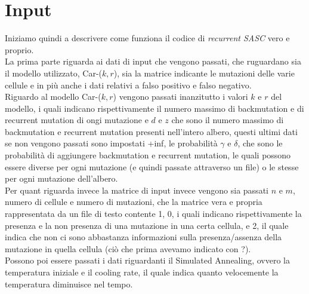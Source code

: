 \documentclass{report}
\begin{document}
  \section{Input}
  Iniziamo quindi a descrivere come funziona il codice di \emph{recurrent SASC} vero e proprio.\\
  La prima parte riguarda ai dati di input che vengono passati, che ruguardano sia il modello utilizzato, Car-($k, r$), sia la matrice indicante le mutazioni delle varie cellule e in più anche i dati relativi a falso positivo e falso negativo.\\
  Riguardo al modello Car-($k, r$) vengono passati inanzitutto i valori $k$ e $r$ del modello, i quali indicano rispettivamente il numero massimo di backmutation e di recurrent mutation di ongi mutazione e $d$ e $z$ che sono il numero massimo di backmutation e recurrent mutation presenti nell'intero albero, questi ultimi dati se non vengono passati sono impostati +inf, le probabilità $\gamma$ e $\delta$, che sono le probabilità di aggiungere backmutation e recurrent mutation, le quali possono essere diverse per ogni mutazione (e quindi passate attraverso un file) o le stesse per ogni mutazione dell'albero.\\
  Per quant riguarda invece la matrice di input invece vengono sia passati $n$ e $m$, numero di cellule e numero di mutazioni, che la matrice vera e propria rappresentata da un file di testo contente 1, 0, i quali indicano rispettivamente la presenza e la non presenza di una mutazione in una certa cellula, e 2, il quale indica che non ci sono abbastanza informazioni sulla presenza/assenza della mutazione in quella cellula (ciò che prima avevamo indicato con ?).\\
  Possono poi essere passati i dati riguardanti il Simulated Annealing, ovvero la temperatura iniziale e il cooling rate, il quale indica quanto velocemente la temperatura diminuisce nel tempo.
\end{document}
